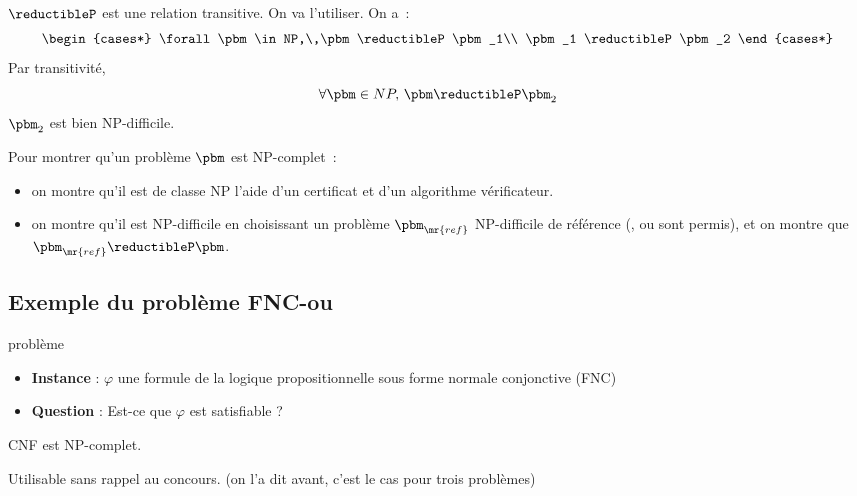 \begin{demonstration}
    $\reductibleP$ est une relation transitive. On va l'utiliser. On a~:
    $$ \begin{cases*}
        \forall \pbm \in NP,\,\pbm \reductibleP \pbm_1\\
        \pbm_1 \reductibleP \pbm_2
    \end{cases*} $$
    Par transitivité,
    $$\forall \pbm \in NP,\,\pbm \reductibleP \pbm_2$$
    $\pbm_2$ est bien NP-difficile.
\end{demonstration}

\begin{remarque}{}{}
    Pour montrer qu'un problème $\pbm$ est NP-complet~:
    \begin{itemize}
        \item on montre qu'il est de classe NP  l'aide d'un certificat et d'un algorithme vérificateur.
        \item on montre qu'il est NP-difficile en choisissant un problème $\pbm_\mr{ref}$ NP-difficile de référence (\sat, \cnfsat ou \troissat sont permis), et on montre que $\pbm_\mr{ref} \reductibleP \pbm$.
    \end{itemize}
\end{remarque}

\subsection{Exemple du problème FNC-\sat ou \cnfsat}

\begin{definition}{}{problème \cnfsat}
    \begin{itemize}
        \item \textbf{Instance} : $\varphi$ une formule de la logique propositionnelle sous forme normale conjonctive (FNC)
        \item \textbf{Question} : Est-ce que $\varphi$ est satisfiable ?
    \end{itemize}
\end{definition}

\begin{proposition}{}{}
    CNF est NP-complet.
\end{proposition}

\begin{remarque}{}{}
    Utilisable sans rappel au concours. (on l'a dit avant, c'est le cas pour trois problèmes)
\end{remarque}

